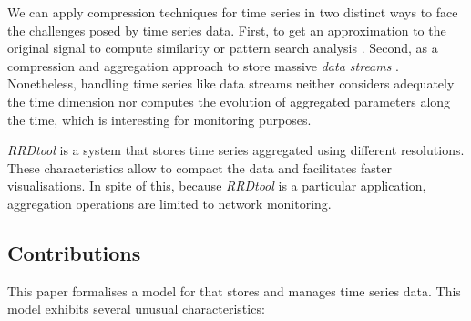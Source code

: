 We can apply compression techniques for time series in two distinct
ways to face the challenges posed by time series data. First, to get
an approximation to the original signal to compute similarity or
pattern search analysis \cite{fu11,keogh01,last01}. Second, as a
compression and aggregation approach to store massive \emph{data
  streams} \cite{cormode08:pods,bonnet01}. Nonetheless, handling time
series like data streams neither considers adequately the time
dimension nor computes the evolution of aggregated parameters along
the time, which is interesting for monitoring purposes.

\emph{RRDtool} \cite{rrdtool} is a system that stores time series
aggregated using different resolutions. These characteristics allow
to compact the data and facilitates faster visualisations. In spite of
this, because \emph{RRDtool} is a particular application,
aggregation operations are limited to network monitoring.


\subsection{Contributions}

This paper formalises a model for  that stores and manages
time series data. This model exhibits several unusual characteristics:

